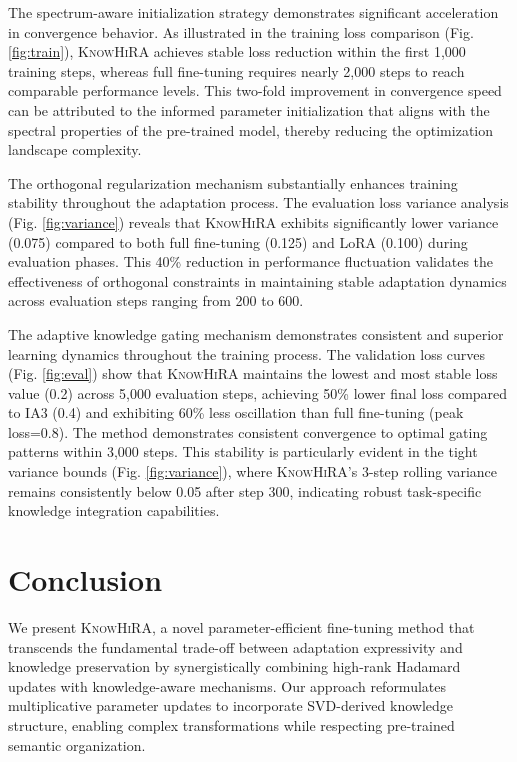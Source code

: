 \documentclass[10pt,letterpaper]{article}
\begin{document}
The spectrum-aware initialization strategy demonstrates significant acceleration in convergence behavior. As illustrated in the training loss comparison (Fig. \ref{fig:train}), \textsc{KnowHiRA} achieves stable loss reduction within the first 1,000 training steps, whereas full fine-tuning requires nearly 2,000 steps to reach comparable performance levels. This two-fold improvement in convergence speed can be attributed to the informed parameter initialization that aligns with the spectral properties of the pre-trained model, thereby reducing the optimization landscape complexity.

The orthogonal regularization mechanism substantially enhances training stability throughout the adaptation process. The evaluation loss variance analysis (Fig. \ref{fig:variance}) reveals that \textsc{KnowHiRA} exhibits significantly lower variance (0.075) compared to both full fine-tuning (0.125) and LoRA (0.100) during evaluation phases. This 40\% reduction in performance fluctuation validates the effectiveness of orthogonal constraints in maintaining stable adaptation dynamics across evaluation steps ranging from 200 to 600.

The adaptive knowledge gating mechanism demonstrates consistent and superior learning dynamics throughout the training process. The validation loss curves (Fig. \ref{fig:eval}) show that \textsc{KnowHiRA} maintains the lowest and most stable loss value (0.2) across 5,000 evaluation steps, achieving 50\% lower final loss compared to IA3 (0.4) and exhibiting 60\% less oscillation than full fine-tuning (peak loss=0.8). The method demonstrates consistent convergence to optimal gating patterns within 3,000 steps. This stability is particularly evident in the tight variance bounds (Fig. \ref{fig:variance}), where \textsc{KnowHiRA}'s 3-step rolling variance remains consistently below 0.05 after step 300, indicating robust task-specific knowledge integration capabilities.

\section{Conclusion}

We present \textsc{KnowHiRA}, a novel parameter-efficient fine-tuning method that transcends the fundamental trade-off between adaptation expressivity and knowledge preservation by synergistically combining high-rank Hadamard updates with knowledge-aware mechanisms. Our approach reformulates multiplicative parameter updates to incorporate SVD-derived knowledge structure, enabling complex transformations while respecting pre-trained semantic organization.
\end{document}
